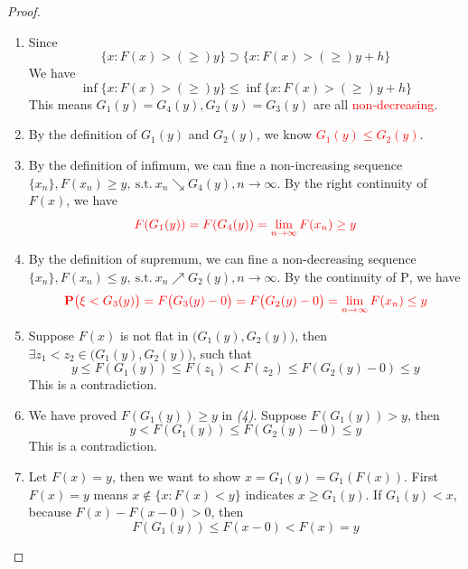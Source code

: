 \documentclass[11pt]{article}
\renewcommand{\(}{\left(}%
\renewcommand{\)}{\right)}%
\renewcommand{\[}{\left[}%
\renewcommand{\]}{\right]}%
\newcommand{\p}{\bm{\mathrm{P}}}
\newcommand{\st}{\mathrm{\ s.t.\ }}
\newcommand{\li}{\lim\limits_}
\newtheorem{proof}{Proof.}}
\begin{document}
\begin{proof}
\begin{enumerate}[\itshape (1)]
    \item Since 
    \begin{equation*}
     \{x:F(x)>(\geq ) y\}\supset\{x:F(x)>(\geq ) y+h\}
    \end{equation*}
    We have 
    \begin{equation*}
     \inf \{x:F(x)>(\geq ) y\}\leq\inf\{x:F(x)>(\geq ) y+h\}
    \end{equation*}
    This means $G_1(y)=G_4(y),G_2(y)=G_3(y)$ are all \textcolor{red}{ non-decreasing}.
    \item By the definition of $G_1(y)$ and $G_2(y)$, we know \textcolor{red}{ $G_1(y)\leq G_2(y)$}.
    \item By the definition of infimum, we can fine a non-increasing sequence $\{x_n\},F(x_n)\geq y,\st x_n\searrow G_4(y),n\to\infty$. By the right continuity of $F(x)$, we have 
    \begin{equation*}
     \textcolor{red}{ F(G_1(y) )=F(G_4(y) )=\li{n\to\infty} F(x_n)\geq y}
    \end{equation*}
    \item By the definition of supremum, we can fine a non-decreasing sequence $\{x_n\},F(x_n)\leq y,\st x_n\nearrow G_2(y),n\to\infty$. By the continuity of $\p$, we have 
    \begin{equation*}
     \textcolor{red}{ \p\big(\xi<G_3(y)\big)=F\big(G_3(y)-0 \big)=F\big(G_2(y)-0 \big)=\li{n\to\infty} F(x_n)\leq y}
    \end{equation*}
    \item Suppose $F(x)$ is not flat in $\big(G_1(y),G_2(y)\big)$, then $\exists z_1<z_2\in \big(G_1(y),G_2(y)\big)$, such that 
    \begin{equation*}
     y\leq F(G_1(y)) \leq F(z_1)< F(z_2)\leq F(G_2(y)-0)\leq y
    \end{equation*}
    This is a contradiction.
    \item We have proved $F(G_1(y))\geq y$ in {\itshape (4)}. Suppose $F(G_1(y))>y$, then 
    \begin{equation*}
     y<F(G_1(y))\leq  F(G_2(y)-0 )\leq y
    \end{equation*}
    This is a contradiction. 
    \item Let $F(x)=y$, then we want to show $x=G_1(y)=G_1(F(x))$. First $F(x)=y$ means $x\notin\{x:F(x)<y\}$ indicates $x\geq G_1(y)$. If $G_1(y)<x$, because $F(x)-F(x-0)>0$, then
    \begin{equation*}
     F(G_1(y))\leq F(x-0)<F(x)=y
    \end{equation*}

\end{enumerate}
\end{proof}
\end{document}
